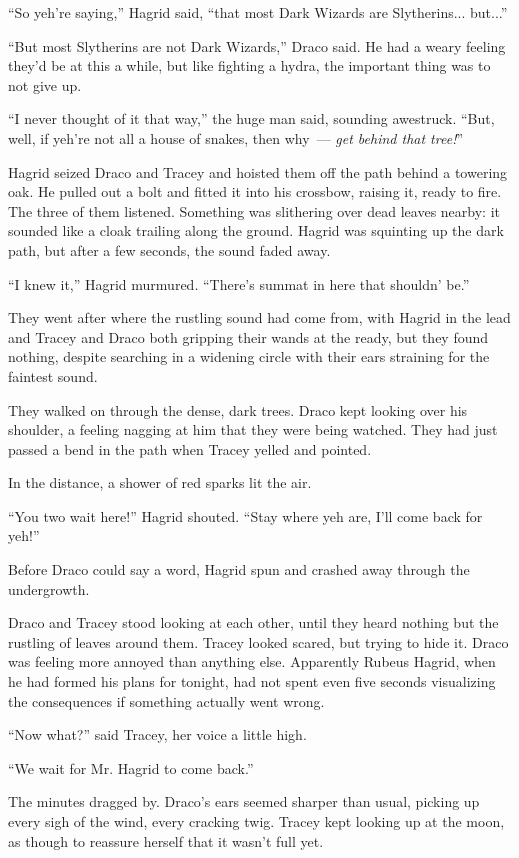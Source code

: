 ``So yeh're saying,'' Hagrid said, ``that most Dark Wizards are Slytherins... but...''

``But most Slytherins are not Dark Wizards,'' Draco said. He had a weary feeling they'd be at this a while, but like fighting a hydra, the important thing was to not give up.

``I never thought of it that way,'' the huge man said, sounding awestruck. ``But, well, if yeh're not all a house of snakes, then why~--- \emph{get behind that tree!}''

Hagrid seized Draco and Tracey and hoisted them off the path behind a towering oak. He pulled out a bolt and fitted it into his crossbow, raising it, ready to fire. The three of them listened. Something was slithering over dead leaves nearby: it sounded like a cloak trailing along the ground. Hagrid was squinting up the dark path, but after a few seconds, the sound faded away.

``I knew it,'' Hagrid murmured. ``There's summat in here that shouldn' be.''

They went after where the rustling sound had come from, with Hagrid in the lead and Tracey and Draco both gripping their wands at the ready, but they found nothing, despite searching in a widening circle with their ears straining for the faintest sound.

They walked on through the dense, dark trees. Draco kept looking over his shoulder, a feeling nagging at him that they were being watched. They had just passed a bend in the path when Tracey yelled and pointed.

In the distance, a shower of red sparks lit the air.

``You two wait here!'' Hagrid shouted. ``Stay where yeh are, I'll come back for yeh!''

Before Draco could say a word, Hagrid spun and crashed away through the undergrowth.

Draco and Tracey stood looking at each other, until they heard nothing but the rustling of leaves around them. Tracey looked scared, but trying to hide it. Draco was feeling more annoyed than anything else. Apparently Rubeus Hagrid, when he had formed his plans for tonight, had not spent even five seconds visualizing the consequences if something actually went wrong.

``Now what?'' said Tracey, her voice a little high.

``We wait for Mr. Hagrid to come back.''

The minutes dragged by. Draco's ears seemed sharper than usual, picking up every sigh of the wind, every cracking twig. Tracey kept looking up at the moon, as though to reassure herself that it wasn't full yet.

